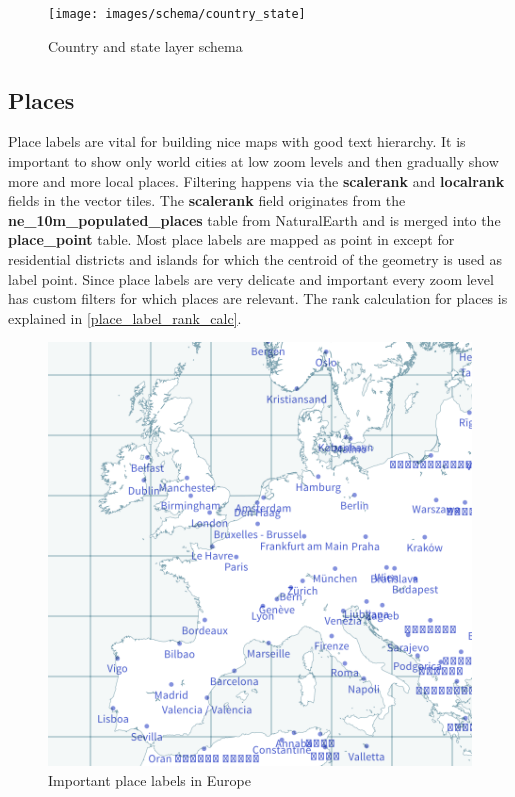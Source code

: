\begin{figure}[H]
  \centering
  \texttt{[image: images/schema/country\_state]}
  \caption{Country and state layer schema}
\end{figure}

\subsection{Places}

\noindent\begin{minipage}[t]{0.48\linewidth}
    \vspace{0pt}
    Place labels are vital for building nice maps with good text hierarchy.
    It is important to show only world cities at low zoom levels and then gradually show more and more local places. Filtering happens via the \textbf{scalerank} and \textbf{localrank} fields in the vector tiles. The \textbf{scalerank} field originates from the \textbf{ne\_10m\_populated\_places} table from NaturalEarth and is merged into the \textbf{place\_point} table. Most place labels are mapped as point in \osm{} except for residential districts and islands for which the centroid of the geometry is used as label point.
    Since place labels are very delicate and important
    every zoom level has custom filters for which places are relevant.
    The rank calculation for places is explained in \autoref{place_label_rank_calc}.
\end{minipage}
\hfill
\begin{minipage}[t]{0.48\linewidth}
    \begin{figure}[H]
      \includegraphics[width=1\textwidth]{images/schema/place_example}
      \caption{Important place labels in Europe}
    \end{figure}
\end{minipage}

